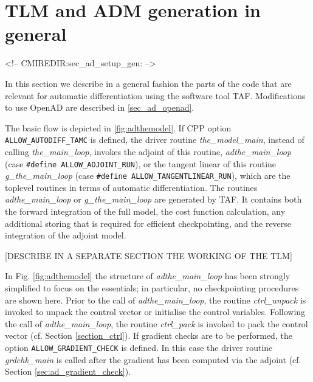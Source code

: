 


\newpage 

\section{TLM and ADM generation in general}
\label{sec_ad_setup_gen}
\begin{rawhtml}
<!-- CMIREDIR:sec_ad_setup_gen: -->
\end{rawhtml}

In this section we describe in a general fashion 
the parts of the code that are relevant for automatic
differentiation using the software tool TAF.
Modifications to use OpenAD are described in \ref{sec_ad_openad}. 



The basic flow is depicted in \ref{fig:adthemodel}.
If CPP option \texttt{ALLOW\_AUTODIFF\_TAMC} is defined, 
the driver routine
{\it the\_model\_main}, instead of calling {\it the\_main\_loop},
invokes the adjoint of this routine, {\it adthe\_main\_loop}
(case \texttt{\#define ALLOW\_ADJOINT\_RUN}), or
the tangent linear of this routine {\it g\_the\_main\_loop}
(case \texttt{\#define ALLOW\_TANGENTLINEAR\_RUN}),
which are the toplevel routines in terms of automatic differentiation.
The routines {\it adthe\_main\_loop} or {\it g\_the\_main\_loop}
are generated by TAF.
It contains both the forward integration of the full model, the
cost function calculation, 
any additional storing that is required for efficient checkpointing, 
and the reverse integration of the adjoint model.

[DESCRIBE IN A SEPARATE SECTION THE WORKING OF THE TLM]

In Fig. \ref{fig:adthemodel}
the structure of {\it adthe\_main\_loop} has been strongly
simplified to focus on the essentials; in particular, no checkpointing
procedures are shown here.
Prior to the call of {\it adthe\_main\_loop}, the routine
{\it ctrl\_unpack} is invoked to unpack the control vector
or initialise the control variables.
Following the call of {\it adthe\_main\_loop}, 
the routine {\it ctrl\_pack}
is invoked to pack the control vector
(cf. Section \ref{section_ctrl}).
If gradient checks are to be performed, the option 
{\tt ALLOW\_GRADIENT\_CHECK} is defined. In this case
the driver routine {\it grdchk\_main} is called after
the gradient has been computed via the adjoint
(cf. Section \ref{sec:ad_gradient_check}).

